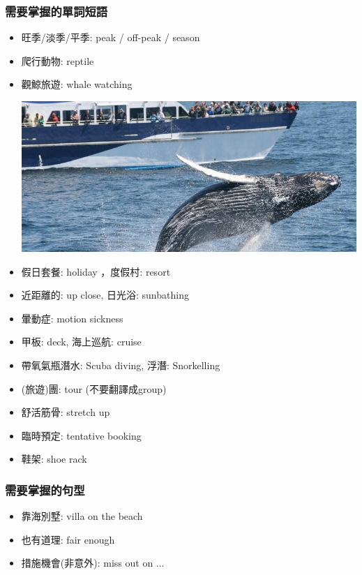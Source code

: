 \subsubsection*{需要掌握的單詞短語}
\begin{itemize}
  \itemsep0em
  \item 旺季/淡季/平季: peak / off-peak /  season
  \item 爬行動物: reptile
  \item 觀鯨旅遊: whale watching
  \begin{center}
    \includegraphics[scale=.5]{pics/whale-watching}
  \end{center}
  \item 假日套餐: holiday ，度假村: resort
  \item 近距離的: up close, 日光浴: sunbathing
  \item 暈動症: motion sickness
  \item 甲板: deck, 海上巡航: cruise
  \item 帶氧氣瓶潛水: Scuba diving, 浮潛: Snorkelling
  \item (旅遊)團: tour (不要翻譯成group)
  \item 舒活筋骨: stretch up
  \item 臨時預定: tentative booking
  \item 鞋架: shoe rack
\end{itemize}

\subsubsection*{需要掌握的句型}
\begin{itemize}
  \itemsep0em
  \item 靠海別墅: villa on the beach
  \item 也有道理: fair enough
  \item 措施機會(非意外): miss out on ...
\end{itemize}

